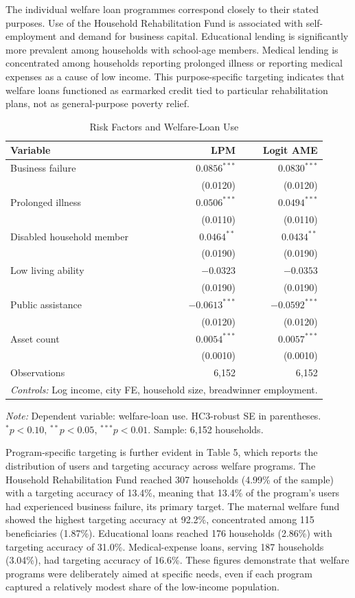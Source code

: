 \documentclass[12pt,a4paper]{article}
\begin{document}
The individual welfare loan programmes correspond closely to their stated purposes. Use of the Household Rehabilitation Fund is associated with self-employment and demand for business capital. Educational lending is significantly more prevalent among households with school-age members. Medical lending is concentrated among households reporting prolonged illness or reporting medical expenses as a cause of low income. This purpose-specific targeting indicates that welfare loans functioned as earmarked credit tied to particular rehabilitation plans, not as general-purpose poverty relief.

\begin{table}[!h]
\centering
\small
\caption{Risk Factors and Welfare-Loan Use}
\label{tab:shocks}
\begin{tabular}{lrr}
\toprule
Variable & LPM & Logit AME \\
\midrule
Business failure & $0.0856^{***}$ & $0.0830^{***}$ \\
 & (0.0120) & (0.0120) \\
Prolonged illness & $0.0506^{***}$ & $0.0494^{***}$ \\
 & (0.0110) & (0.0110) \\
Disabled household member & $0.0464^{**}$ & $0.0434^{**}$ \\
 & (0.0190) & (0.0190) \\
Low living ability & $-0.0323$ & $-0.0353$ \\
 & (0.0190) & (0.0190) \\
Public assistance & $-0.0613^{***}$ & $-0.0592^{***}$ \\
 & (0.0120) & (0.0120) \\
Asset count & $0.0054^{***}$ & $0.0057^{***}$ \\
 & (0.0010) & (0.0010) \\
\midrule
Observations & 6,152 & 6,152 \\
\midrule
\multicolumn{3}{p{0.4\textwidth}}{\emph{Controls:} Log income, city FE, household size, breadwinner employment.} \\
\bottomrule
\end{tabular}

\noindent\small\emph{Note:} Dependent variable: welfare-loan use. HC3-robust SE in parentheses. $^{*}p<0.10$, $^{**}p<0.05$, $^{***}p<0.01$. Sample: 6,152 households.
\end{table}

Program-specific targeting is further evident in Table 5, which reports the distribution of users and targeting accuracy across welfare programs. The Household Rehabilitation Fund reached 307 households (4.99\% of the sample) with a targeting accuracy of 13.4\%, meaning that 13.4\% of the program's users had experienced business failure, its primary target. The maternal welfare fund showed the highest targeting accuracy at 92.2\%, concentrated among 115 beneficiaries (1.87\%). Educational loans reached 176 households (2.86\%) with targeting accuracy of 31.0\%. Medical-expense loans, serving 187 households (3.04\%), had targeting accuracy of 16.6\%. These figures demonstrate that welfare programs were deliberately aimed at specific needs, even if each program captured a relatively modest share of the low-income population.
\end{document}
